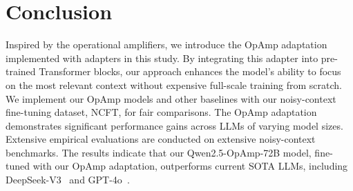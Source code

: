 \section{Conclusion}
Inspired by the operational amplifiers, we introduce the OpAmp adaptation implemented with adapters in this study. 
By integrating this adapter into pre-trained Transformer blocks, our approach enhances the model's ability to focus on the most relevant context without expensive full-scale training from scratch. 
We implement our OpAmp models and other baselines with our noisy-context fine-tuning dataset, NCFT, for fair comparisons.
The OpAmp adaptation demonstrates significant performance gains across LLMs of varying model sizes. 
Extensive empirical evaluations are conducted on extensive noisy-context benchmarks. 
The results indicate that our Qwen2.5-OpAmp-72B model, fine-tuned with our OpAmp adaptation, outperforms current SOTA LLMs,
including DeepSeek-V3~\cite{liu2024deepseekv3} and GPT-4o~\cite{hurst2024gpt4o}.

